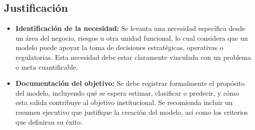 \documentclass[11pt,oneside]{article}%
\begin{document}
\subsection{Justificación}
\begin{itemize}
\item \textbf{Identificación de la necesidad:} Se levanta una necesidad específica desde un área del negocio, riesgos u otra unidad funcional, lo cual considera que un modelo puede apoyar la toma de decisiones estratégicas, operativas o regulatorias. Esta necesidad debe estar claramente vinculada con un problema o meta cuantificable. 
\item \textbf{Documentación del objetivo:} Se debe registrar formalmente el propósito del modelo, incluyendo qué se espera estimar, clasificar o predecir, y cómo esta salida contribuye al objetivo institucional. Se recomienda incluir un resumen ejecutivo que justifique la creación del modelo, así como los criterios que definiran su éxito. 
\end{itemize}

\end{document}
